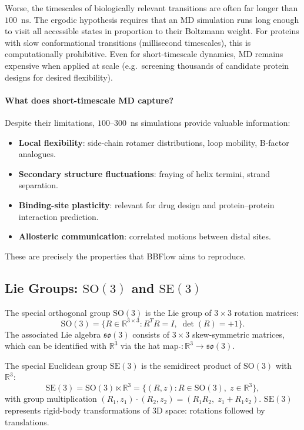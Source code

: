 \documentclass[12pt,a4paper]{article}
\newcommand{\SE}{\mathrm{SE}(3)}
\newcommand{\SOthree}{\mathrm{SO}(3)}
\newcommand{\Rthree}{\mathbb{R}^3}
\begin{document}
Worse, the timescales of biologically relevant transitions are often far longer than $100$~ns.
The ergodic hypothesis requires that an MD simulation runs long enough to visit all accessible
states in proportion to their Boltzmann weight.  For proteins with slow conformational
transitions (millisecond timescales), this is computationally prohibitive.  Even for short-timescale
dynamics, MD remains expensive when applied at scale (e.g.\ screening thousands of candidate
protein designs for desired flexibility).

\paragraph{What does short-timescale MD capture?}
Despite their limitations, $100$--$300$~ns simulations provide valuable information:
\begin{itemize}
  \item \textbf{Local flexibility}: side-chain rotamer distributions, loop mobility, B-factor
    analogues.
  \item \textbf{Secondary structure fluctuations}: fraying of helix termini, strand separation.
  \item \textbf{Binding-site plasticity}: relevant for drug design and protein--protein interaction
    prediction.
  \item \textbf{Allosteric communication}: correlated motions between distal sites.
\end{itemize}
These are precisely the properties that BBFlow aims to reproduce.

\subsection{Lie Groups: \texorpdfstring{$\SOthree$}{SO(3)} and \texorpdfstring{$\SE$}{SE(3)}}
\label{sec:lie}

The special orthogonal group $\SOthree$ is the Lie group of $3 \times 3$ rotation matrices:
\begin{equation}
  \SOthree = \{R \in \mathbb{R}^{3\times 3} : R^T R = I,\; \det(R) = +1\}.
\end{equation}
The associated Lie algebra $\mathfrak{so}(3)$ consists of $3\times 3$ skew-symmetric matrices,
which can be identified with $\Rthree$ via the hat map $\hat{}: \Rthree \to \mathfrak{so}(3)$.

The special Euclidean group $\SE$ is the semidirect product of $\SOthree$ with $\Rthree$:
\begin{equation}
  \SE = \SOthree \ltimes \Rthree = \{(R, z) : R \in \SOthree,\; z \in \Rthree\},
\end{equation}
with group multiplication $(R_1, z_1) \cdot (R_2, z_2) = (R_1 R_2,\; z_1 + R_1 z_2)$.
$\SE$ represents rigid-body transformations of 3D space: rotations followed by translations.
\end{document}
